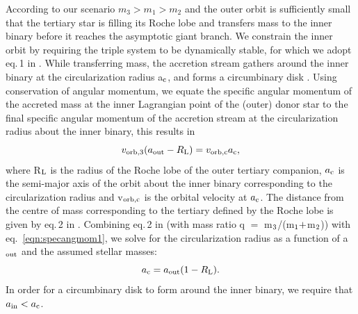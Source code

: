 \documentclass[twocolumn]{aastex62}
\begin{document}
According to our scenario $m_3 > m_1 > m_2$ and the outer orbit is
sufficiently small that the tertiary star is filling its Roche lobe
and transfers mass to the inner binary before it reaches the asymptotic
giant branch. We constrain the inner orbit by requiring the triple
system to be dynamically stable, for which we adopt eq.\,1 in
\cite{1999ASIC..522..385M}.  While transferring mass, the accretion
stream gathers around the inner binary at the circularization radius
a$_{\rm c}$, and forms a circumbinary disk
\citep{2002apa..book.....F}.  Using conservation of angular momentum,
we equate the specific angular momentum of the accreted mass at the
inner Lagrangian point of the (outer) donor star to the final specific
angular momentum of the accretion stream at the circularization radius
about the inner binary, this results in
\begin{equation}
\label{eqn:specangmom1}
v_{\rm orb,3}(a_{\rm out} - R_{\rm L}) = v_{\rm orb,c}a_{\rm c},
\end{equation}
where R$_{\rm L}$ is the radius of the Roche lobe of the outer
tertiary companion, $a_{\rm c}$ is the semi-major axis of the orbit
about the inner binary corresponding to the circularization radius and
v$_{\rm orb,c}$ is the orbital velocity at $a_{\rm c}$.  The distance
from the centre of mass corresponding to the tertiary defined by the
Roche lobe is given by eq.\,2 in \cite{1983ApJ...268..368E}.
Combining eq.\,2 in \citet{1983ApJ...268..368E} (with mass ratio q
$=$ m$_{\rm 3}$/(m$_{\rm 1} +$m$_{\rm 2}$)) with
eq.~\ref{eqn:specangmom1}, we solve for the circularization
radius as a function of a$_{\rm out}$ and the assumed stellar masses:
\begin{equation}
\label{eqn:ac}
a_{\rm c} = a_{\rm out}(1 - R_{\rm L}).
\end{equation}
In order for a circumbinary disk to form around the inner binary, we
require that $a_{\rm in} < a_{\rm c}$.
\end{document}
